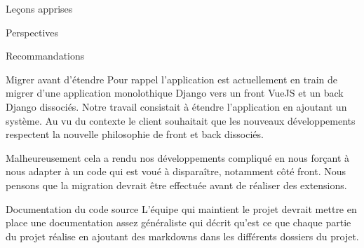 \documentclass[]{article}
\begin{document}
{\begin{section}{Leçons apprises}
\end{section}

\begin{section}{Perspectives}

\end{section}

\begin{section}{Recommandations}
    \begin{subsection}{Migrer avant d'étendre}
        Pour rappel l'application est actuellement en train de migrer d'une application monolothique Django vers un front VueJS et un back Django dissociés. Notre travail consistait à étendre l'application en ajoutant un système. Au vu du contexte le client souhaitait que les nouveaux développements respectent la nouvelle philosophie de front et back dissociés. 
        
        Malheureusement cela a rendu nos développements compliqué en nous forçant à nous adapter à un code qui est voué à disparaître, notamment côté front. Nous pensons que la migration devrait être effectuée avant de réaliser des extensions.
    \end{subsection}

    \begin{subsection}{Documentation du code source}
        L'équipe qui maintient le projet devrait mettre en place une documentation assez généraliste qui décrit qu'est ce que chaque partie du projet réalise en ajoutant des markdowns dans les différents dossiers du projet.
    \end{subsection}
\end{section}

}
\end{document}
